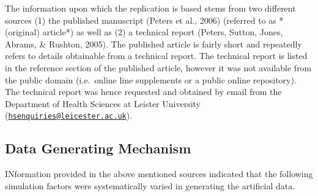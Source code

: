 \documentclass[
  english,
  doc,floatsintext,draftall]{apa6}
\begin{document}
The information upon which the replication is based stems from two different sources (1) the published manuscript (Peters et al., 2006) (referred to as * (original) article*) as well as (2) a technical report (Peters, Sutton, Jones, Abrams, \& Rushton, 2005).
The published article is fairly short and repeatedly refers to details obtainable from a technical report.
The technical report is listed in the reference section of the published article, however it was not available from the public domain (i.e.~online line supplements or a public online repository).
The technical report was hence requested and obtained by email from the Department of Health Sciences at Leister University (\href{mailto:hsenquiries@leicester.ac.uk}{\nolinkurl{hsenquiries@leicester.ac.uk}}).

\hypertarget{data-generating-mechanism}{%
\subsection{Data Generating Mechanism}\label{data-generating-mechanism}}

INformation provided in the above mentioned sources indicated that the following simulation factors were systematically varied in generating the artificial data.
\end{document}
